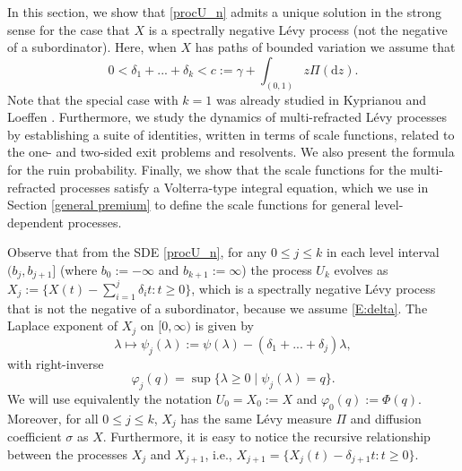 \documentclass[12pt,reqno]{amsart}
\newtheorem{lemma}[theorem]{Lemma}
\theoremstyle{definition}
\theoremstyle{remark}
\newcommand{\drift}{c}
\begin{document}
		In this section, we show that \eqref{procU_n} admits a unique solution  in the strong sense for the case that $X$ 
		is a spectrally negative L\'evy process (not the negative of a subordinator). Here, when $X$ has paths of bounded variation we assume that
		\begin{equation}\label{E:delta}
 0<\delta_1+...+\delta_k < \drift := \gamma + \int_{(0,1)} z \Pi(\mathrm{d}z).
\end{equation}
Note that the special case with $k=1$ was already studied in Kyprianou and Loeffen \cite{kyprianouloeffen2010}.
Furthermore, we study the dynamics of multi-refracted L\'evy processes by establishing a suite of identities, 
written in terms of scale functions, related to the one- and two-sided exit problems and resolvents. 
We also present the formula for the ruin probability. Finally, we show that the scale functions for the multi-refracted processes 
satisfy a Volterra-type integral equation, which we use in Section \ref{general premium} to define the
scale functions for general level-dependent processes. 

Observe that from the SDE \eqref{procU_n}, for any $0 \leq j \leq k$ in each level
interval $(b_{j},b_{j+1}]$ (where $b_0:=-\infty$ and $b_{k+1}:=\infty$) the process $U_k$ evolves as
$X_{j}:=\{X(t)-\sum_{i=1}^{j} \delta_i t: t\geq 0  \}$, which is a spectrally negative L\'evy process that
is not the negative of a subordinator, because we assume \eqref{E:delta}.  
The Laplace exponent of $X_j$ on $[0, \infty)$ is given by
$$
\lambda \mapsto \psi_j(\lambda) := \psi(\lambda) - (\delta_1+...+\delta_j) \lambda,
$$
with right-inverse $$\varphi_{j}(q) = \sup \{ \lambda \geq 0 \mid \psi_j(\lambda) = q\}.$$ 
We will use equivalently the notation $U_0=X_0:=X$ and $\varphi_{0}(q):=\Phi(q)$.
Moreover, for all $0 \leq j \leq k$, $X_j$ has the same L\'evy measure $\Pi$ and diffusion coefficient $\sigma$ as $X$. 
Furthermore, it is easy to notice the recursive relationship between the processes $X_j$ and $X_{j+1}$, i.e.,
$X_{j+1}=\{X_j(t)-\delta_{j+1} t : t\geq 0 \}$.
  



  
\end{document}
